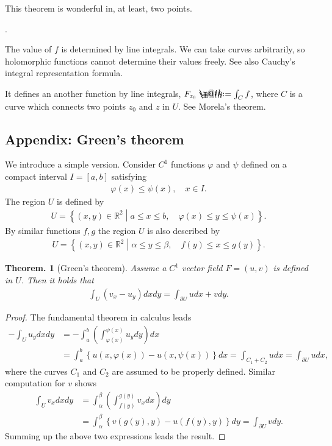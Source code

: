 \documentclass[openany, a4paper, oneside]{jsbook}
\makeatletter
\newcounter{enum2}
\renewenvironment{enumerate}{%
\begin{list}%
{%
\arabic{enum2}.\ \,%
}%
{%
\usecounter{enum2}
\setlength{\itemindent}{0pt}%
\setlength{\leftmargin}{15pt}%
\setlength{\rightmargin}{0pt}%
\setlength{\labelsep}{0pt}%
\setlength{\labelwidth}{6pt}%
\setlength{\itemsep}{0pt}%
\setlength{\parsep}{0pt}%
\setlength{\listparindent}{0pt}%
}
}{%
\end{list}%
}
\newcommand*{\defeq}{\mathrel{\rlap{%
\raisebox{0.3ex}{$\m@th\cdot$}}%
\raisebox{-0.3ex}{$\m@th\cdot$}}%
=}
\theoremstyle{break}
\newtheorem{thm}{Theorem.}[section]
\theoremstyle{breakdefn}
\newcommand{\rbk}[1]{\left (#1\right)}
\newcommand{\cbk}[1]{\left\{#1\right\}}
\newcommand{\relmiddle}[1]{\mathrel{}\middle#1\mathrel{}}
\newcommand{\set}[2]{\left\{#1 \relmiddle| #2\right\}}
\newcommand{\bbR}{\mathbb{R}}
\makeatother
\begin{document}
This theorem is wonderful in, at least, two points.
\begin{enumerate}
\item The value of $f$ is determined by line integrals.
   We can take curves arbitrarily, so holomorphic functions cannot determine their values freely.
   See also Cauchy's integral representation formula.
\item It defines an another function by line integrals, $F_{z_0} \defeq \int_{C} f$, where $C$ is a curve which connects two points $z_0$ and $z$ in $U$.
   See Morela's theorem.
\end{enumerate}
\subsection{Appendix: Green's theorem}


We introduce a simple version.
Consider $C^1$ functions $\varphi$ and $\psi$ defined on a compact interval $I=[a, b]$ satisfying
\begin{align}
 \varphi (x) \leq \psi (x), \quad x \in I.
\end{align}
The region $U$ is defined by
\begin{align}
 U
 =
 \set{(x,y) \in \bbR^2}{a \leq x \leq b, \quad \varphi (x) \leq y \leq \psi (x)}.
\end{align}
By similar functions $f, g$ the region $U$ is also described by
\begin{align}
 U
 =
 \set{(x,y) \in \bbR^2}{\alpha \leq y \leq \beta, \quad f (y) \leq x \leq g (y)}.
\end{align}
\begin{thm}[Green's theorem]
 Assume a $C^1$ vector field $F = (u, v)$ is defined in $U$.
 Then it holds that
 \begin{align}
  \int_U \rbk{v_x - u_y} dx dy
  =
  \int_{\partial U} udx + vdy.
 \end{align}
\end{thm}
\begin{proof}
The fundamental theorem in calculus leads
\begin{align}
 -\int_U u_y dx dy
 &=
 -\int_a^b \rbk{\int_{\varphi (x)}^{\psi (x)} u_y dy} dx \\
 &=
 \int_a^b \cbk{u (x, \varphi (x)) - u (x, \psi (x))} dx
 =
 \int_{C_1 + C_2} u dx
 =
 \int_{\partial U} u dx,
\end{align}
where the curves $C_1$ and $C_2$ are assumed to be properly defined.
Similar computation for $v$ shows
\begin{align}
 \int_U v_x dx dy
 &=
 \int_{\alpha}^{\beta} \rbk{\int_{f (y)}^{g (y)} v_x dx} dy \\
 &=
 \int_{\alpha}^{\beta} \cbk{v (g (y), y) - u (f (y), y)} dy
 =
 \int_{\partial U} v dy.
\end{align}
Summing up the above two expressions leads the result.
\end{proof}
\end{document}
